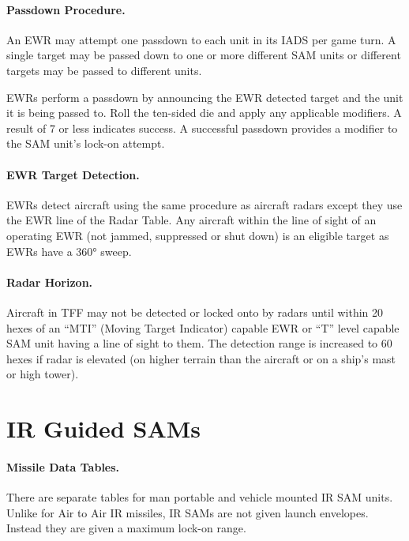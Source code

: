 \paragraph{Passdown Procedure.} An EWR may attempt one passdown to each unit in its IADS per game turn. A single target may be passed down to one or more different SAM units or different targets may be passed to different units.

EWRs perform a passdown by announcing the EWR detected target and the unit it is being passed to. Roll the ten-sided die and apply any applicable modifiers. A result of 7 or less indicates success. A successful passdown provides a  modifier to the SAM unit's lock-on attempt.

\paragraph{EWR Target Detection.} EWRs detect aircraft using the same procedure as aircraft radars except they use the EWR line of the Radar Table. Any aircraft within the line of sight of an operating EWR (not jammed, suppressed or shut down) is an eligible target as EWRs have a 360° sweep.  



\paragraph{Radar Horizon.} Aircraft in TFF may not be detected or locked onto by radars until within 20 hexes of an “MTI” (Moving Target Indicator) capable EWR or “T” level capable SAM unit having a line of sight to them. The detection range is increased to 60 hexes if radar is elevated (on higher terrain than the aircraft or on a ship’s mast or high tower).

\section{IR Guided SAMs}

\paragraph{Missile Data Tables.} There are separate tables for man portable and vehicle mounted IR SAM units. Unlike for Air to Air IR missiles, IR SAMs are not given launch envelopes. Instead they are given a maximum lock-on range.

